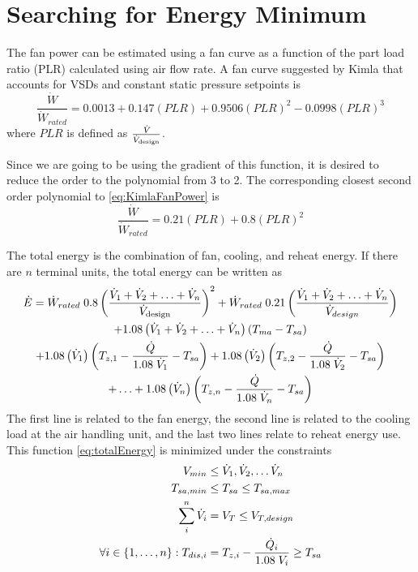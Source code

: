 \section{Searching for Energy Minimum}

The fan power can be estimated using a fan curve as a function of the part load ratio (PLR) calculated using air flow rate. A fan curve suggested by Kimla that accounts for VSDs and constant static pressure setpoints is
\begin{equation}\label{eq:KimlaFanPower}
\frac{\dot{W}}{\dot{W}_{rated}} = 0.0013+0.147\left(PLR \right)+0.9506\left(PLR \right)^2-0.0998\left(PLR \right)^3
\end{equation}
where \(PLR\) is defined as \(\frac{\dot{V}_{}}{\dot{V}_{\text{design}}}\).

Since we are going to be using the gradient of this function, it is desired to reduce the order to the polynomial from 3 to 2. The corresponding closest second order polynomial to \ref{eq:KimlaFanPower} is
\begin{equation}\label{eq:finalFanPower}
\frac{\dot{W}}{\dot{W}_{rated}} = 0.21\left(PLR \right)+0.8\left(PLR \right)^2
\end{equation}

The total energy is the combination of fan, cooling, and reheat energy. If there are \(n\) terminal units, the total energy can be written as
\begin{multline}\label{eq:totalEnergy}
    \dot{E}=\dot{W}_{rated}\;0.8 \left(\frac{\dot{V}_{1}+\dot{V}_{2}+\ldots+\dot{V}_{n}}{\dot{V}_{\text{design}}} \right)^2 + \dot{W}_{rated}\;0.21 \left(\frac{\dot{V}_{1}+\dot{V}_{2}+\ldots+\dot{V}_{n}}{\dot{V}_{design}} \right)\\
+1.08\left(\dot{V}_{1}+\dot{V}_{2}+\ldots+\dot{V}_{n} \right)\left(T_{ma}-T_{sa} \right)\\
+1.08\left(\dot{V}_{1} \right)\left(T_{z,1}-\frac{\dot{Q}}{1.08\; \dot{V}_{1}} -T_{sa}\right) +1.08\left(\dot{V}_{2} \right)\left(T_{z,2}-\frac{\dot{Q}}{1.08\; \dot{V}_{2}} -T_{sa}\right)\\ 
+\ldots+1.08\left(\dot{V}_{n} \right)\left(T_{z,n}-\frac{\dot{Q}}{1.08\; \dot{V}_{n}} -T_{sa}\right) 
\end{multline}
The first line is related to the fan energy, the second line is related to the cooling load at the air handling unit, and the last two lines relate to reheat energy use. 
This function \ref{eq:totalEnergy} is minimized under the constraints
\begin{align}
    V_{min}&\leq \dot{V}_{1}, \dot{V}_{2}, \ldots \dot{V}_{n} \\
T_{sa,min}&\leq T_{sa} \leq T_{sa,max} \\
    \sum_i^n \dot{V}_{i} &= V_T \leq V_{T,design} \\
\forall i\in\left\{1,\ldots,n\right\}: T_{dis,i} &= T_{z,i} - \frac{\dot{Q}_i}{1.08\;V_i} \geq T_{sa}
\end{align}

